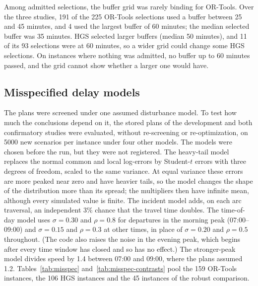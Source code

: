 Among admitted selections, the buffer grid was rarely binding for OR-Tools. Over the three studies, 191 of the 225 OR-Tools selections used a buffer between 25 and 45 minutes, and 4 used the largest buffer of 60 minutes; the median selected buffer was 35 minutes. HGS selected larger buffers (median 50 minutes), and 11 of its 93 selections were at 60 minutes, so a wider grid could change some HGS selections. On instances where nothing was admitted, no buffer up to 60 minutes passed, and the grid cannot show whether a larger one would have.

\subsection{Misspecified delay models}\label{sec:misspec}

The plans were screened under one assumed disturbance model. To test how much the conclusions depend on it, the stored plans of the development and both confirmatory studies were evaluated, without re-screening or re-optimization, on 5000 new scenarios per instance under four other models. The models were chosen before the run, but they were not registered. The heavy-tail model replaces the normal common and local log-errors by Student-$t$ errors with three degrees of freedom, scaled to the same variance. At equal variance these errors are more peaked near zero and have heavier tails, so the model changes the shape of the distribution more than its spread; the multipliers then have infinite mean, although every simulated value is finite. The incident model adds, on each arc traversal, an independent 3\% chance that the travel time doubles. The time-of-day model uses $\sigma=0.30$ and $\rho=0.8$ for departures in the morning peak (07:00--09:00) and $\sigma=0.15$ and $\rho=0.3$ at other times, in place of $\sigma=0.20$ and $\rho=0.5$ throughout. (The code also raises the noise in the evening peak, which begins after every time window has closed and so has no effect.) The stronger-peak model divides speed by 1.4 between 07:00 and 09:00, where the plans assumed 1.2. Tables~\ref{tab:misspec} and~\ref{tab:misspec-contrasts} pool the 159 OR-Tools instances, the 106 HGS instances and the 45 instances of the robust comparison.


